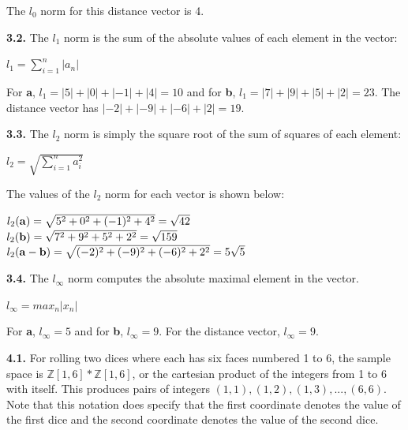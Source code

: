 \documentclass[12pt]{article}
\begin{document}
The $l_{0}$ norm for this distance vector is 4. 

{\bf 3.2.} The $l_{1}$ norm is the sum of the absolute values of each element in the vector:

\begin{center}

$l_{1}=\sum_{i=1}^{n}|a_{n}|$\\

\end{center}

For {\bf a}, $l_{1}=|5|+|0|+|-1|+|4|=10$ and for {\bf b}, $l_{1}=|7|+|9|+|5|+|2|=23$. The distance vector has $|-2|+|-9|+|-6|+|2|=19$. 

{\bf 3.3.} The $l_{2}$ norm is simply the square root of the sum of squares of each element:

\begin{center}

$l_{2}=\sqrt{\sum_{i=1}^{n}a_{i}^{2}}$\\

\end{center}

The values of the $l_{2}$ norm for each vector is shown below:

\begin{center}

$l_{2}({\bf a})=\sqrt{5^{2}+0^{2}+(-1)^{2}+4^{2}}=\sqrt{42}$\\
\bigskip
$l_{2}({\bf b})=\sqrt{7^{2}+9^{2}+5^{2}+2^{2}}=\sqrt{159}$\\
\bigskip
$l_{2}({\bf a-b})=\sqrt{(-2)^{2}+(-9)^{2}+(-6)^{2}+2^{2}}=5\sqrt{5}$\\

\end{center}

{\bf 3.4.} The $l_{\infty}$ norm computes the absolute maximal element in the vector.

\begin{center}

$l_{\infty}=max_{n}|x_{n}|$\\

\end{center}

For {\bf a}, $l_{\infty}=5$ and for {\bf b}, $l_{\infty}=9$. For the distance vector, $l_{\infty}=9$. 

{\bf 4.1.} For rolling two dices where each has six faces numbered 1 to 6, the sample space is $\mathbb{Z}[1, 6]*\mathbb{Z}[1,6]$, or the cartesian product of the integers from 1 to 6 with itself. This produces pairs of integers $(1,1), (1,2), (1,3),...,(6,6)$. Note that this notation does specify that the first coordinate denotes the value of the first dice and the second coordinate denotes the value of the second dice. 
\end{document}
